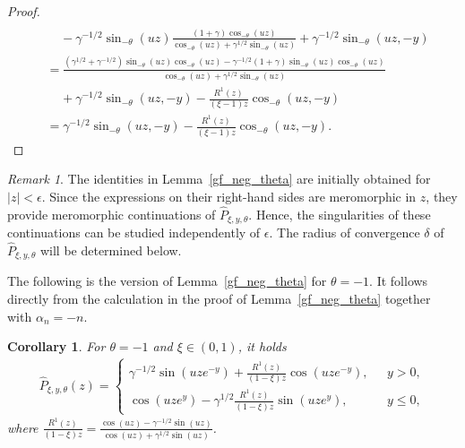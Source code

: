 \documentclass[12pt]{article}
\newcommand{\1}{\mathds{1}}
\theoremstyle{definition}
\theoremstyle{plain}
\newtheorem{Corollary}[definition]{Corollary}
\theoremstyle{remark}
\newtheorem{Remark}{Remark}
\begin{document}
\begin{proof}
\begin{align*}
     \\&~~~~~-\gamma^{-1/2}\sin_{-\theta}\left(uz\right)\frac{(1+\gamma)\cos_{-\theta}(uz)}{\cos_{-\theta}(uz)+\gamma^{1/2}\sin_{-\theta}(uz)}
     +\gamma^{-1/2}\sin_{-\theta}(uz,-y)
     \\&=\frac{(\gamma^{1/2}+\gamma^{-1/2})\sin_{-\theta}(uz)\cos_{-\theta}(uz)-\gamma^{-1/2}(1+\gamma)\sin_{-\theta}(uz)\cos_{-\theta}(uz)}{\cos_{-\theta}(uz)+\gamma^{1/2}\sin_{-\theta}(uz)}
     \\&~~~~~+\gamma^{-1/2}\sin_{-\theta}(uz,-y)-\frac{R^1(z)}{(\xi-1) z}\cos_{-\theta}(uz,-y)
     \\&=\gamma^{-1/2}\sin_{-\theta}(uz,-y)-\frac{R^1(z)}{(\xi-1) z}\cos_{-\theta}(uz,-y).\tag*{\qedhere}
\end{align*}
\end{proof}
\begin{Remark}
    The identities in Lemma~\ref{gf_neg_theta} are initially obtained
for $|z|<\epsilon$. Since the expressions on their right-hand
sides are meromorphic in $z$, they provide meromorphic
continuations of $\hat P_{\xi,y,\theta}$. Hence, the
singularities of these continuations can be studied independently
of $\epsilon$. The radius of convergence $\delta$ of
$\hat P_{\xi,y,\theta}$ will be determined below.
\end{Remark}
The following is the version of Lemma~\ref{gf_neg_theta} for $\theta=-1$. It follows directly from the calculation in the proof of Lemma~\ref{gf_neg_theta} together with $\alpha_n=-n$.
\begin{Corollary}\label{gf_theta-1}
    For $\theta=-1$ and $\xi\in(0,1)$, it holds
    \begin{align*}
      \hat{P}_{\xi,y,\theta}(z)=  
      \begin{cases}
          \gamma^{-1/2}\sin(uze^{-y})+\frac{R^1(z)}{(1-\xi) z}\cos(uze^{-y}),~~~&y>0,
          \\\cos(uze^y)
     -\gamma^{1/2}\frac{R^1(z)}{(1-\xi) z}\sin(uze^y),&y\le 0,
      \end{cases}
    \end{align*}
where $\frac{R^1(z)}{(1-\xi) z}=\frac{\cos(uz)-\gamma^{-1/2}\sin(uz)}{\cos(uz)+\gamma^{1/2}\sin(uz)}$.
\end{Corollary}
\end{document}
